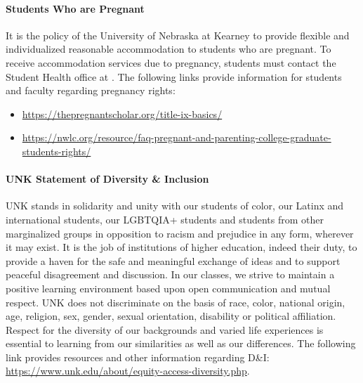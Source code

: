 \documentclass[12pt]{article}
\newcounter{ex}\setcounter{ex}{0}
\begin{document}
\paragraph{Students Who are Pregnant} It is the policy of the University of Nebraska at Kearney to provide flexible and 
individualized reasonable accommodation to students who are pregnant. To receive 
accommodation services due to pregnancy, students must contact the 
Student Health office at . The following links provide information 
for students and faculty regarding pregnancy rights: 

\begin{itemize}
\setlength\itemsep{-0.25em}
\item \url{https://thepregnantscholar.org/title-ix-basics/} 

\item \url{https://nwlc.org/resource/faq-pregnant-and-parenting-college-graduate-students-rights/}

\end{itemize}

\paragraph{UNK Statement of Diversity \& Inclusion}

UNK stands in solidarity and unity with our students of color, our Latinx 
and international students, our LGBTQIA+ students and students from other 
marginalized groups in opposition to racism and prejudice in any form, 
wherever it may exist. It is the job of institutions of higher education, 
indeed their duty, to provide a haven for the safe and meaningful exchange of 
ideas and to support peaceful disagreement and discussion. In our classes, 
we strive to maintain a positive learning environment based upon open 
communication and mutual respect. UNK does not discriminate on the basis of 
race, color, national origin, age, religion, sex, gender, sexual orientation, 
disability or political affiliation. Respect for the diversity of our backgrounds 
and varied life experiences is essential to learning from our similarities as 
well as our differences. The following link provides resources and other 
information regarding D\&I: \url{https://www.unk.edu/about/equity-access-diversity.php}.


  
 
\end{document}
